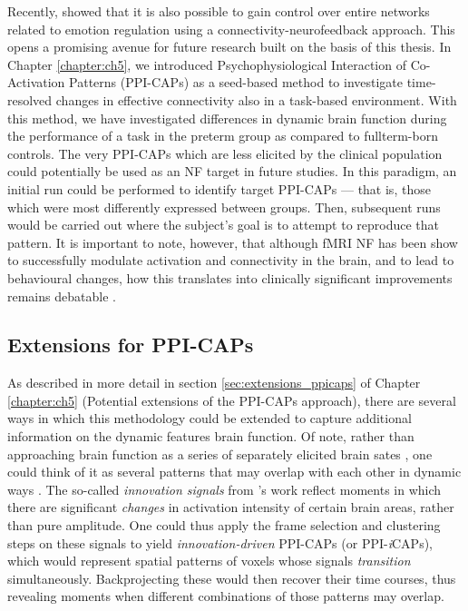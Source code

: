 Recently, \citet{Koush2017} showed that it is also possible to gain control over entire networks related to emotion regulation using a connectivity-neurofeedback approach. This opens a promising avenue for future research built on the basis of this thesis. In Chapter \ref{chapter:ch5}, we introduced Psychophysiological Interaction of Co-Activation Patterns (PPI-CAPs) as a seed-based method to investigate time-resolved changes in effective connectivity also in a task-based environment. With this method, we have investigated differences in dynamic brain function during the performance of a task in the preterm group as compared to fullterm-born controls. The very PPI-CAPs which are less elicited by the clinical population could potentially be used as an NF target in future studies. In this paradigm, an initial run could be performed to identify target PPI-CAPs --- that is, those which were most differently expressed between groups. Then, subsequent runs would be carried out where the subject's goal is to attempt to reproduce that pattern. It is important to note, however, that although fMRI NF has been show to successfully modulate activation and connectivity in the brain, and to lead to behavioural changes, how this translates into clinically significant improvements remains debatable \citep{Thibault2018}.

\subsection*{ Extensions for PPI-CAPs}


As described in more detail in section \ref{sec:extensions_ppicaps} of Chapter \ref{chapter:ch5} (Potential extensions of the PPI-CAPs approach), there are several ways in which this methodology could be extended to capture additional information on the dynamic features brain function. Of  note, rather than approaching brain function as a series of separately elicited brain sates \citep{Leonardi2014,Gonzalez-Castillo2015a, Freitas2020}, one could think of it as several patterns that may overlap with each other in dynamic ways \citep{Karahanoglu2013,Karahanoglu2015a}. The so-called \textit{innovation signals} from \citet{Karahanoglu2013}'s work reflect moments in which there are significant \textit{changes} in activation intensity of certain brain areas, rather than pure amplitude.
One could thus apply the frame selection and clustering steps on these signals to yield \textit{innovation-driven} PPI-CAPs (or PPI-\textit{i}CAPs), which would represent spatial patterns of voxels whose signals \textit{transition} simultaneously. Backprojecting these would then recover their time courses, thus revealing moments when different combinations of those patterns may overlap.   


